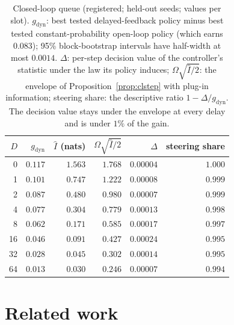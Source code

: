 \documentclass[11pt]{article}
\begin{document}
\begin{table}[h]\centering\footnotesize
\begin{tabular}{rrrrrr}
\toprule
$D$ & $g_{\mathrm{dyn}}$ & $\hat I$ (nats) & $\Omega\sqrt{\hat I/2}$ & $\Delta$ & steering share \\
\midrule
0 & $0.117$ & $1.563$ & $1.768$ & $0.00004$ & $1.000$ \\
1 & $0.101$ & $0.747$ & $1.222$ & $0.00008$ & $0.999$ \\
2 & $0.087$ & $0.480$ & $0.980$ & $0.00007$ & $0.999$ \\
4 & $0.077$ & $0.304$ & $0.779$ & $0.00013$ & $0.998$ \\
8 & $0.062$ & $0.171$ & $0.585$ & $0.00017$ & $0.997$ \\
16 & $0.046$ & $0.091$ & $0.427$ & $0.00024$ & $0.995$ \\
32 & $0.028$ & $0.045$ & $0.302$ & $0.00014$ & $0.995$ \\
64 & $0.013$ & $0.030$ & $0.246$ & $0.00007$ & $0.994$ \\
\bottomrule
\end{tabular}
\caption{Closed-loop queue (registered; held-out seeds; values per slot).
$g_{\mathrm{dyn}}$: best tested delayed-feedback policy minus best tested
constant-probability open-loop policy (which earns $0.083$); 95\% block-bootstrap intervals have half-width
at most $0.0014$. $\Delta$: per-step decision value of the controller's
statistic under the law its policy induces; $\Omega\sqrt{\hat I/2}$: the
envelope of Proposition~\ref{prop:clstep} with plug-in information;
steering share: the descriptive ratio $1-\Delta/g_{\mathrm{dyn}}$. The
decision value stays under the envelope at every delay and is under
$1\%$ of the gain.}
\label{tab:queue}
\end{table}

\section{Related work}\label{sec:related}
\end{document}
